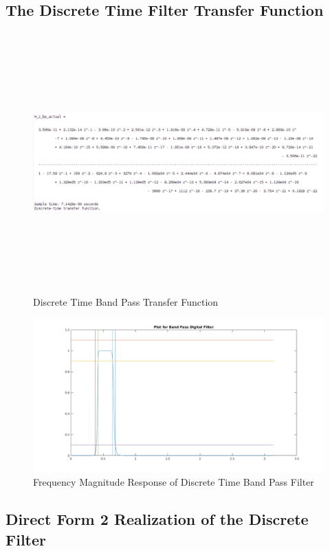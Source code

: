 \documentclass[22pt]{article}
\begin{document}
\subsection{The Discrete Time Filter Transfer Function}
\begin{figure}[H]
  \centering
  \includegraphics[width=1.2\textwidth,height=10cm]{images/Discrete_bp_tf}
  \caption{Discrete Time Band Pass Transfer Function}
  \label{fig:5}
\end{figure}
\begin{figure}[H]
  \centering
  \includegraphics[scale=0.5]{images/Freqz_digital_bp}
  \caption{Frequency Magnitude Response of Discrete Time Band Pass Filter}
  \label{fig:6}
\end{figure}

\subsection{Direct Form 2 Realization of the Discrete Filter}
\end{document}
